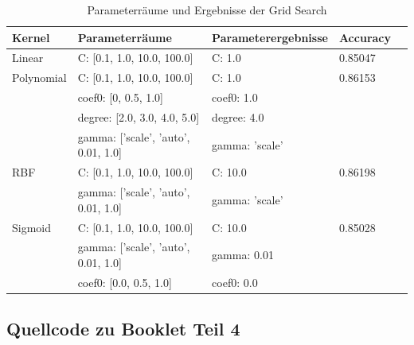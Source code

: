 \begin{table}[H]
	\begin{tabular}{lllll}
		\hline
		Kernel& Parameterräume & Parameterergebnisse & Accuracy \\ \hline
		Linear &  C: [0.1, 1.0, 10.0, 100.0]  &  C: 1.0      &  0.85047   \\ \hline
		Polynomial  &  C: [0.1, 1.0, 10.0, 100.0] & C: 1.0     &  0.86153   \\
		&  coef0: [0, 0.5, 1.0] & coef0: 1.0    &     \\
		&  degree: [2.0, 3.0, 4.0, 5.0] &degree:  4.0   &      \\
		&  gamma: ['scale', 'auto', 0.01, 1.0] & gamma: 'scale'    &      \\\hline
		RBF &  C: [0.1, 1.0, 10.0, 100.0]  &   C: 10.0    &   0.86198   \\
		&  gamma: ['scale', 'auto', 0.01, 1.0] &   gamma: 'scale'   &    \\ \hline
		Sigmoid&  C: [0.1, 1.0, 10.0, 100.0] &   C: 10.0   &  0.85028  \\
		&  gamma: ['scale', 'auto', 0.01, 1.0] &  gamma: 0.01   &   \\
		&  coef0: [0.0, 0.5, 1.0] &  coef0: 0.0   &   \\ \hline
	\end{tabular}
	\caption{ Parameterräume und Ergebnisse der Grid Search}
	\label{tab:svm_results_gridSearch}
\end{table}

\subsection{Quellcode zu Booklet Teil 4}
